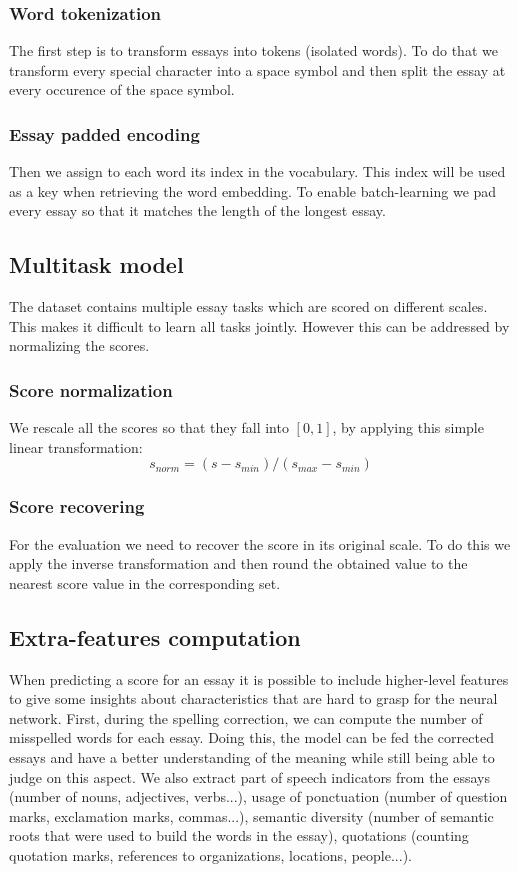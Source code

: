 \documentclass[a4paper,12pt,english]{article}
\begin{document}
\subsubsection{Word tokenization}
The first step is to transform essays into tokens (isolated words).
To do that we transform every special character into a space symbol and then split the essay at every occurence of the space symbol.
\subsubsection{Essay padded encoding}
Then we assign to each word its index in the vocabulary. This index will be used as a key when retrieving the word embedding.
To enable batch-learning we pad every essay so that it matches the length of the longest essay.

\subsection{Multitask model}
The dataset contains multiple essay tasks which are scored on different scales.
This makes it difficult to learn all tasks jointly.
However this can be addressed by normalizing the scores.
\subsubsection{Score normalization}
We rescale all the scores so that they fall into $[0,1]$, by applying this simple linear transformation:
\begin{equation}
s_{norm} = (s - s_{min}) / (s_{max} - s_{min})
\end{equation}
\subsubsection{Score recovering}
For the evaluation we need to recover the score in its original scale.
To do this we apply the inverse transformation and then round the obtained value to the nearest score value in the corresponding set.

\subsection{Extra-features computation}
\label{pos:extrafeats}
When predicting a score for an essay it is possible to include higher-level features to give some insights about characteristics that are hard to grasp for the neural network.
First, during the spelling correction, we can compute the number of misspelled words for each essay. Doing this, the model can be fed the corrected essays and have a better understanding of the meaning while still being able to judge on this aspect.
We also extract part of speech indicators from the essays (number of nouns, adjectives, verbs...), usage of ponctuation (number of question marks, exclamation marks, commas...), semantic diversity (number of semantic roots that were used to build the words in the essay), quotations (counting quotation marks, references to organizations, locations, people...).
\end{document}
